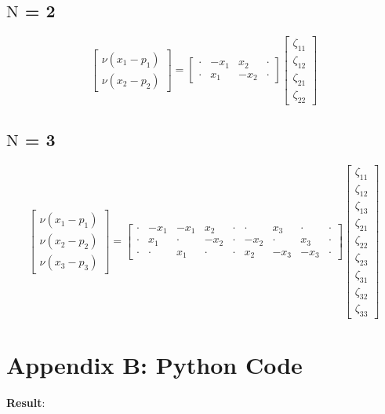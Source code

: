 \documentclass{article}
\begin{document}
\subsection*{$\bm{\mathrm{N}}$ = 2}
\begin{equation}
\left[\begin{array}{c}
\nu (x_1 - p_1) \\
\nu (x_2 - p_2) 
\end{array}\right]
= 
\left[\begin{array}{cccc}
\cdot & -x_1  &  x_2  & \cdot \\
\cdot &  x_1  & -x_2  & \cdot
\end{array}\right]
\left[\begin{array}{c}
\zeta_{11} \\ \zeta_{12} \\ \zeta_{21} \\ \zeta_{22}
\end{array}\right]
\end{equation}
\subsection*{$\bm{\mathrm{N}}$ = 3}
\begin{equation}
\left[\begin{array}{c}
\nu (x_1 - p_1) \\
\nu (x_2 - p_2) \\
\nu (x_3 - p_3) 
\end{array}\right]
= 
\left[\begin{array}{ccccccccc}
\cdot & -x_1  & -x_1  &  x_2  & \cdot & \cdot &  x_3  & \cdot & \cdot \\
\cdot &  x_1  & \cdot & -x_2  & \cdot & -x_2  & \cdot &  x_3  & \cdot \\
\cdot & \cdot &  x_1  & \cdot & \cdot &  x_2  & -x_3  & -x_3  & \cdot 
\end{array}\right]
\left[\begin{array}{c}
\zeta_{11} \\ \zeta_{12} \\ \zeta_{13} \\ \zeta_{21} \\ \zeta_{22} \\ \zeta_{23} \\ \zeta_{31} \\ \zeta_{32} \\ \zeta_{33}
\end{array}\right]
\end{equation}
\clearpage\section*{Appendix B: Python Code}\label{ap:code}

\textbf{Result}:

\end{document}
